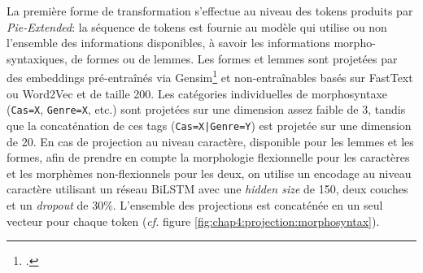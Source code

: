 La première forme de transformation s'effectue au niveau des tokens produits par \textit{Pie-Extended}: la séquence de tokens est fournie au modèle qui utilise ou non l'ensemble des informations disponibles, à savoir les informations morpho-syntaxiques, de formes ou de lemmes. Les formes et lemmes sont projetées par des embeddings pré-entraînés via Gensim\footcite{Gensim} et non-entraînables basés sur FastText ou Word2Vec et de taille 200. Les catégories individuelles de morphosyntaxe (\texttt{Cas=X}, \texttt{Genre=X}, etc.) sont projetées sur une dimension assez faible de 3, tandis que la concaténation de ces tags (\texttt{Cas=X|Genre=Y}) est projetée sur une dimension de 20. En cas de projection au niveau caractère, disponible pour les lemmes et les formes, afin de prendre en compte la morphologie flexionnelle pour les caractères et les morphèmes non-flexionnels pour les deux, on utilise un encodage au niveau caractère utilisant un réseau BiLSTM avec une \textit{hidden size} de 150, deux couches et un \textit{dropout} de 30\%. L'ensemble des projections est concaténée en un seul vecteur pour chaque token (\textit{cf.} figure \ref{fig:chap4:projection:morphosyntax}).

